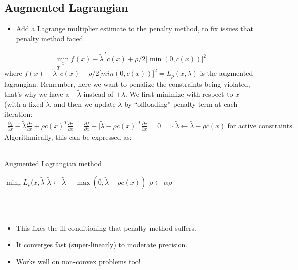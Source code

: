\subsection{Augmented Lagrangian}
\begin{itemize}
    \item Add a Lagrange multiplier estimate to the penalty method,  to fix issues that penalty method faced.
\end{itemize}
\begin{align}
    \min_x f(x) - \tilde{\lambda}^T c(x) + \rho /2 \big[ \min(0,c(x)) \big]^2
\end{align}
where $f(x) - \tilde{\lambda}^T c(x) + \rho /2 \big[ min(0,c(x)) \big]^2 = L_{\rho}(x,\lambda)$ is the augmented lagrangian. 
Remember, here we want to penalize the constraints being violated, that's why we have a $-\tilde{\lambda}$ instead of $+\lambda$.
We first minimize with respect to $x$ (with a fixed $\tilde{\lambda}$, and then we update $\tilde{\lambda}$ by ``offloading'' penalty term at each iteration: 
\begin{align}
    \frac{\partial f}{\partial x} - \tilde{\lambda} \frac{\partial c}{\partial x} + \rho c(x)^T \frac{\partial c}{\partial x} = \frac{\partial f}{\partial x} - \big[ \tilde{\lambda} - \rho c(x) \big]^T \frac{\partial c}{\partial x} = 0
    \implies \tilde{\lambda} \gets \tilde{\lambda} - \rho c(x) \ \textrm{for active constraints}.
\end{align}
Algorithmically, this can be expressed as: 
\\
\\
\noindent
\begin{algorithm}
	\caption{Augmented Lagrangian method}
	\label{alg:auglag}
	\begin{algorithmic}[1]	
            \State $\min_x L_{\rho} (x, \tilde{\lambda}$ 
            \State $\tilde{\lambda} \gets \tilde{\lambda} - \max(0, \tilde{\lambda}-\rho c(x)) $ 
            \State $\rho \gets \alpha \rho$ 
        \EndWhile
	\end{algorithmic}
\end{algorithm}
\\
\\
\begin{itemize}
    \item This fixes the ill-conditioning that penalty method suffers. 
    \item It converges fast (super-linearly) to moderate precision. 
    \item Works well on non-convex problems too! 
\end{itemize}

